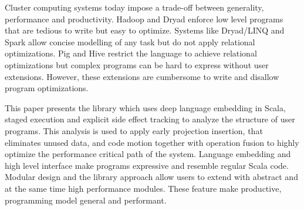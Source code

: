 Cluster computing systems today impose a trade-off between generality, performance and productivity. Hadoop and Dryad enforce low level programs that are tedious to write but easy to optimize. Systems like Dryad/LINQ and Spark allow concise modelling of any task but do not apply relational optimizations. Pig and Hive restrict the language to achieve relational optimizations but complex programs can be hard to express without user extensions. However, these extensions are cumbersome to write and disallow program optimizations.

This paper presents the \tool library which uses deep language embedding in Scala, staged execution and explicit side effect tracking to analyze the structure of user programs. This analysis is used to apply early projection insertion, that eliminates unused data, and code motion together with operation fusion to highly optimize the performance critical path of the system. Language embedding and high level interface make \tool programs expressive and resemble regular Scala code. Modular design and the library approach allow users to extend \tool with abstract and at the same time high performance modules. These feature make  \tool productive, programming model general and performant.
 